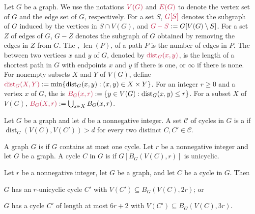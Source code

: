 \documentclass{patmorin}
\newcommand{\pat}[1]{\textcolor{Blue}{[Pat: #1]}}
\newcommand{\gwen}[1]{\textcolor{Purple}{Gwen: #1}}
\newcommand{\piotr}[1]{\textcolor{red}{Piotr: #1}}
\DeclareMathOperator{\len}{len}
\DeclareMathOperator{\dist}{dist}
\begin{document}
Let $G$ be a graph.  We use the notations $\mathdefin{V(G)}$ and $\mathdefin{E(G)}$ to denote the vertex set of $G$ and the edge set of $G$, respectively.  For a set $S$, $\mathdefin{G[S]}$ denotes the subgraph of $G$ induced by the vertices in $S\cap V(G)$, and $\mathdefin{G-S}:=G[V(G)\setminus S]$.  For a set $Z$ of edges of $G$, $G-Z$ denotes the subgraph of $G$ obtained by removing the edges in $Z$ from $G$.  
The , $\len(P)$, of a path $P$
is the number of edges in $P$. 
The  between two vertices $x$ and $y$ of $G$, 
denoted by $\mathdefin{\dist_G(x,y)}$, 
is the length of a shortest path in $G$ with endpoints $x$ and $y$ if there is one, or $\infty$ if there is none.  
For nonempty subsets $X$ and $Y$ of $V(G)$, 
define $\mathdefin{\dist_G(X,Y)}:=\min\{\dist_G(x,y):(x,y)\in X\times Y\}$. 
For an integer $r\ge 0$ and a vertex $x$ of $G$, 
the  is $\mathdefin{B_G(x,r)}:=\{y\in V(G):\dist_G(x,y)\le r\}$.  For a subset $X$ of $V(G)$, $\mathdefin{B_G(X,r)}:=\bigcup_{x\in X}B_G(x,r)$.

Let $G$ be a graph and let $d$ be a nonnegative integer.
A set $\mathcal{C}$ of cycles in $G$ is a  if $\dist_G(V(C),V(C'))> d$ for every two distinct $C,C'\in\mathcal{C}$.


A graph $G$ is  if $G$ contains at most one cycle.  Let $r$ be a nonnegative integer and let $G$ be a graph.
A cycle $C$ in $G$ is 
if $G[B_G(V(C),r)]$ is unicyclic.


\begin{lem}\label{short_or_unicycle_nearby}
  Let $r$ be a nonnegative integer, let $G$ be a graph, and let $C$ be a cycle in $G$.
  Then 
  \begin{tightenum}%
    \item $G$ has an $r$-unicyclic cycle $C'$ with $V(C')\subseteq B_G(V(C),2r)$; or\label{short_or_unicycle_nearby:unicyclic}     
    \item $G$ has a cycle $C'$ of length at most $6r+2$ with $V(C')\subseteq B_G(V(C),3r)$.\label{short_or_unicycle_nearby:short}     
  \end{tightenum}
\end{lem}
\end{document}
